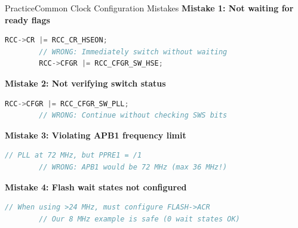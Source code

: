 \documentclass{beamer}
\begin{document}
\begin{frame}[fragile]{Practice}{Common Clock Configuration Mistakes}
	\textbf{Mistake 1: Not waiting for ready flags}
	\begin{lstlisting}[language=C, basicstyle=\ttfamily\footnotesize]
		RCC->CR |= RCC_CR_HSEON;
		// WRONG: Immediately switch without waiting
		RCC->CFGR |= RCC_CFGR_SW_HSE;
	\end{lstlisting}
	
	\textbf{Mistake 2: Not verifying switch status}
	\begin{lstlisting}[language=C, basicstyle=\ttfamily\footnotesize]
		RCC->CFGR |= RCC_CFGR_SW_PLL;
		// WRONG: Continue without checking SWS bits
	\end{lstlisting}
	
	\textbf{Mistake 3: Violating APB1 frequency limit}
	\begin{lstlisting}[language=C, basicstyle=\ttfamily\footnotesize]
		// PLL at 72 MHz, but PPRE1 = /1
		// WRONG: APB1 would be 72 MHz (max 36 MHz!)
	\end{lstlisting}
	
	\textbf{Mistake 4: Flash wait states not configured}
	\begin{lstlisting}[language=C, basicstyle=\ttfamily\footnotesize]
		// When using >24 MHz, must configure FLASH->ACR
		// Our 8 MHz example is safe (0 wait states OK)
	\end{lstlisting}
\end{frame}
\end{document}
